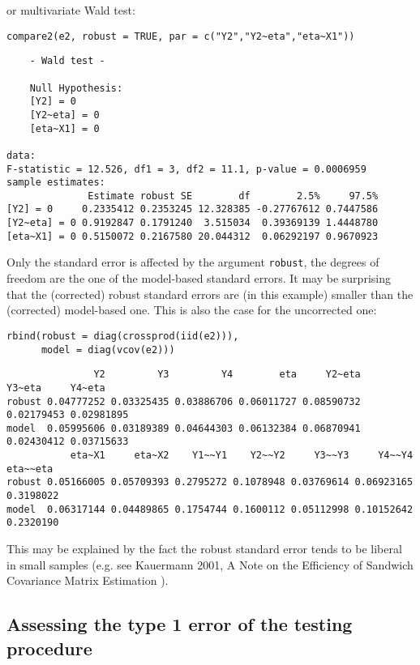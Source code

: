 \documentclass[12pt]{article}
\begin{document}
or multivariate Wald test:
\lstset{language=r,label= ,caption= ,captionpos=b,numbers=none}
\begin{lstlisting}
compare2(e2, robust = TRUE, par = c("Y2","Y2~eta","eta~X1"))
\end{lstlisting}

\begin{verbatim}
	- Wald test -

	Null Hypothesis:
	[Y2] = 0
	[Y2~eta] = 0
	[eta~X1] = 0

data:  
F-statistic = 12.526, df1 = 3, df2 = 11.1, p-value = 0.0006959
sample estimates:
              Estimate robust SE        df        2.5%     97.5%
[Y2] = 0     0.2335412 0.2353245 12.328385 -0.27767612 0.7447586
[Y2~eta] = 0 0.9192847 0.1791240  3.515034  0.39369139 1.4448780
[eta~X1] = 0 0.5150072 0.2167580 20.044312  0.06292197 0.9670923
\end{verbatim}

Only the standard error is affected by the argument \texttt{robust}, the
degrees of freedom are the one of the model-based standard errors.  It
may be surprising that the (corrected) robust standard errors are (in
this example) smaller than the (corrected) model-based one. This is
also the case for the uncorrected one:
\lstset{language=r,label= ,caption= ,captionpos=b,numbers=none}
\begin{lstlisting}
rbind(robust = diag(crossprod(iid(e2))),
	  model = diag(vcov(e2)))
\end{lstlisting}

\begin{verbatim}
               Y2         Y3         Y4        eta     Y2~eta     Y3~eta     Y4~eta
robust 0.04777252 0.03325435 0.03886706 0.06011727 0.08590732 0.02179453 0.02981895
model  0.05995606 0.03189389 0.04644303 0.06132384 0.06870941 0.02430412 0.03715633
           eta~X1     eta~X2    Y1~~Y1    Y2~~Y2     Y3~~Y3     Y4~~Y4  eta~~eta
robust 0.05166005 0.05709393 0.2795272 0.1078948 0.03769614 0.06923165 0.3198022
model  0.06317144 0.04489865 0.1754744 0.1600112 0.05112998 0.10152642 0.2320190
\end{verbatim}

This may be explained by the fact the robust standard error tends to
be liberal in small samples (e.g. see Kauermann 2001, A Note on the
Efficiency of Sandwich Covariance Matrix Estimation ).
\subsection{Assessing the type 1 error of the testing procedure}
\label{sec:orgfe15dec}
\end{document}
